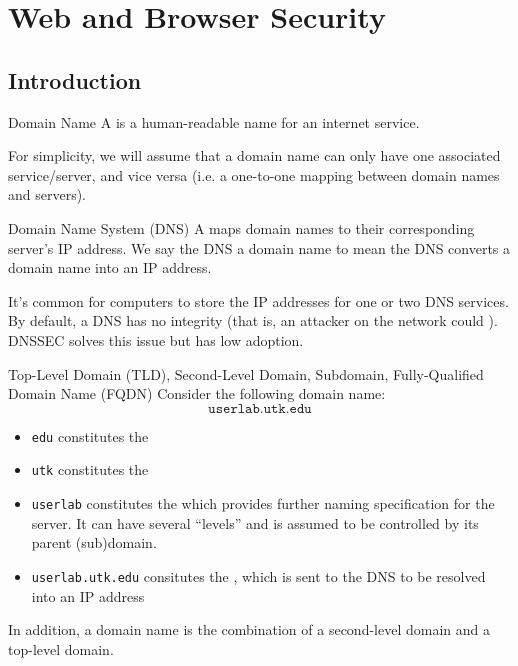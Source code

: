 \chapter{Web and Browser Security}

\section{Introduction}

\begin{dfnbox}{Domain Name}{}
    A  is a human-readable name for an internet service.
\end{dfnbox}

For simplicity, we will assume that a domain name can only have one associated service/server, and vice versa (i.e. a one-to-one mapping between domain names and servers).

\begin{dfnbox}{Domain Name System (DNS)}{}
    A  maps domain names to their corresponding server's IP address. We say the DNS  a domain name to mean the DNS converts a domain name into an IP address.
\end{dfnbox}

It's common for computers to store the IP addresses for one or two DNS services. By default, a DNS has no integrity (that is, an attacker on the network could ). DNSSEC solves this issue but has low adoption.

\begin{dfnbox}{Top-Level Domain (TLD), Second-Level Domain, Subdomain, Fully-Qualified Domain Name (FQDN)}{}
    Consider the following domain name:
    \[ \texttt{userlab.utk.edu} \]
    \begin{itemize}[noitemsep]
        \item \texttt{edu} constitutes the 
        \item \texttt{utk} constitutes the 
        \item \texttt{userlab} constitutes the  which provides further naming specification for the server. It can have several ``levels'' and is assumed to be controlled by its parent (sub)domain.
        \item \texttt{userlab.utk.edu} consitutes the , which is sent to the DNS to be resolved into an IP address
    \end{itemize}

    In addition, a domain name is the combination of a second-level domain and a top-level domain.
\end{dfnbox}

